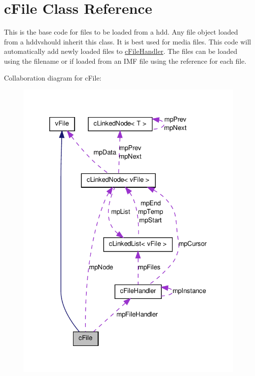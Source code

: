 \hypertarget{classc_file}{
\section{cFile Class Reference}
\label{classc_file}
}


This is the base code for files to be loaded from a hdd. Any file object loaded from a hddvshould inherit this class. It is best used for media files. This code will automatically add newly loaded files to \hyperlink{classc_file_handler}{cFileHandler}. The files can be loaded using the filename or if loaded from an IMF file using the reference for each file.  




Collaboration diagram for cFile:\nopagebreak
\begin{figure}[H]
\begin{center}
\leavevmode
\includegraphics[width=320pt]{classc_file__coll__graph}
\end{center}
\end{figure}
